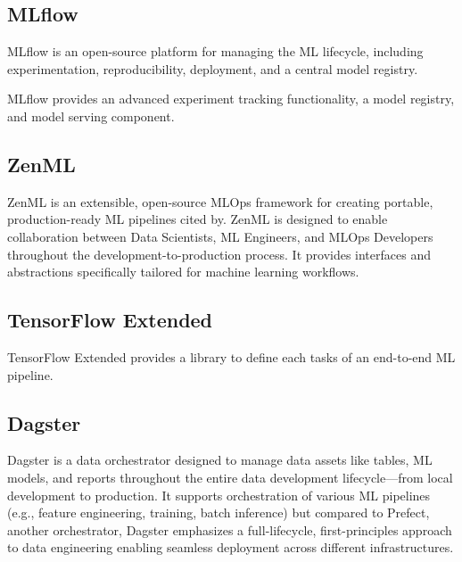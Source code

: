 \subsection{MLflow}\label{subsec:mlflow}
MLflow is an open-source platform for managing the ML lifecycle, including experimentation, reproducibility,
deployment, and a central model registry.\cite{mlflow}

MLflow provides an advanced experiment tracking functionality, a model registry, and
model serving component\cite{Kreuzberger2022MachineLO}.

\subsection{ZenML}\label{subsec:zenml}
ZenML is an extensible, open-source MLOps framework for creating portable, production-ready ML pipelines cited by\cite{blockchain-mlops}.
ZenML is designed to enable collaboration between Data Scientists, ML Engineers, and MLOps Developers throughout the development-to-production process\cite{landscape}.
It provides interfaces and abstractions specifically tailored for machine learning workflows.

\subsection{TensorFlow Extended}\label{subsec:tensorflow-extended}
TensorFlow Extended provides a library to define each tasks of an end-to-end ML
pipeline\cite{Kreuzberger2022MachineLO}.

\subsection{Dagster}\label{subsec:dagster}
Dagster is a data orchestrator designed to manage data assets like tables, ML models, and reports throughout the entire data development lifecycle—from local development to production\cite{landscape}.
It supports orchestration of various ML pipelines (e.g., feature engineering, training, batch inference) but
compared to Prefect, another orchestrator, Dagster emphasizes a full-lifecycle, first-principles approach to data engineering enabling seamless deployment across different infrastructures\cite{landscape}.

